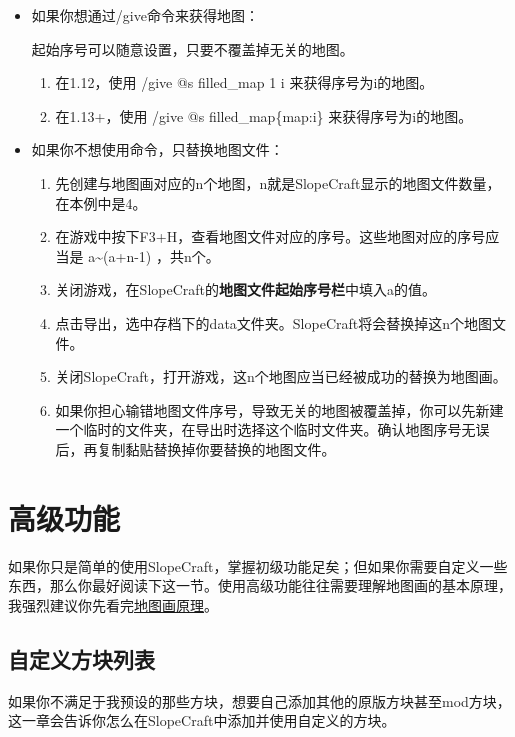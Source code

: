\documentclass[UTF8]{ctexart}
\begin{document}
   \begin{itemize}
       \item 如果你想通过/give命令来获得地图：
       
       起始序号可以随意设置，只要不覆盖掉无关的地图。
       \begin{enumerate}
           \item 在1.12，使用 /give @s filled\_map 1 i 来获得序号为i的地图。
           \item 在1.13+，使用 /give @s filled\_map\{map:i\} 来获得序号为i的地图。
       \end{enumerate}
       \item 如果你不想使用命令，只替换地图文件：
       \begin{enumerate}
           \item 先创建与地图画对应的n个地图，n就是SlopeCraft显示的地图文件数量，在本例中是4。
           \item 在游戏中按下F3+H，查看地图文件对应的序号。这些地图对应的序号应当是 a\textasciitilde(a+n-1) ，共n个。
           \item 关闭游戏，在SlopeCraft的\textbf{地图文件起始序号栏}中填入a的值。
           \item 点击导出，选中存档下的data文件夹。SlopeCraft将会替换掉这n个地图文件。
           \item 关闭SlopeCraft，打开游戏，这n个地图应当已经被成功的替换为地图画。
           \item 如果你担心输错地图文件序号，导致无关的地图被覆盖掉，你可以先新建一个临时的文件夹，在导出时选择这个临时文件夹。确认地图序号无误后，再复制黏贴替换掉你要替换的地图文件。
       \end{enumerate}
   \end{itemize}
   
   \pagebreak
   \section{高级功能}
   如果你只是简单的使用SlopeCraft，掌握初级功能足矣；但如果你需要自定义一些东西，那么你最好阅读下这一节。使用高级功能往往需要理解地图画的基本原理，我强烈建议你先看完\href{https://github.com/ToKiNoBug/SlopeCraftTutorial/blob/main/BasicPrinciple/Principle%20of%20map%20pixel%20arts.md}{地图画原理}。

   \subsection{自定义方块列表}
   如果你不满足于我预设的那些方块，想要自己添加其他的原版方块甚至mod方块，这一章会告诉你怎么在SlopeCraft中添加并使用自定义的方块。
   
\end{document}
